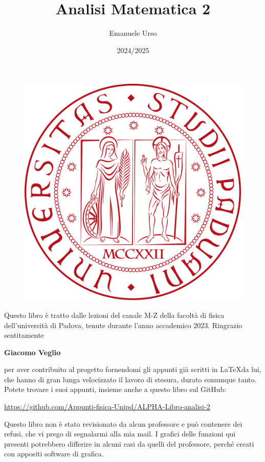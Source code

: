 \documentclass[a4paper]{article}
\begin{document}
	

	
	\title{\Huge Analisi Matematica 2}
	\author{{\Large Emanuele Urso} \\
	{\small{\href{mailto:emanuele.urso@studenti.unipd.it}{\color{black}{emanuele.urso@studenti.unipd.it} }}}}
	\date{2024/2025}
	\maketitle
	
	\begin{figure}[!h]
		\centering
		\includegraphics[width=0.5\linewidth]{header/UniPdlogo.png}
	\end{figure}
	
	\vfill
	
	Questo libro è tratto dalle lezioni del canale M-Z della facoltà di fisica dell'università di Padova, tenute durante l'anno accademico 2023. Ringrazio sentitamente
	
	{\centering \large \textbf{Giacomo Veglio} \par}
	
	per aver contribuito al progetto fornendomi gli appunti già scritti in \LaTeX da lui, che hanno di gran lunga velocizzato il lavoro di stesura, durato comunque tanto. Potete trovare i suoi appunti, insieme anche a questo libro sul GitHub: 
	
	{\centering \color{blue}
	\url{https://github.com/Appunti-fisica-Unipd/ALPHA-Libro-analisi-2} \par} 
	
	Questo libro non è stato revisionato da alcun professore e può contenere dei refusi, che vi prego di segnalarmi alla mia mail. I grafici delle funzioni qui presenti potrebbero differire in alcuni casi da quelli del professore, perché creati con appositi software di grafica.
		
	\vspace{3em}
	
\end{document}
